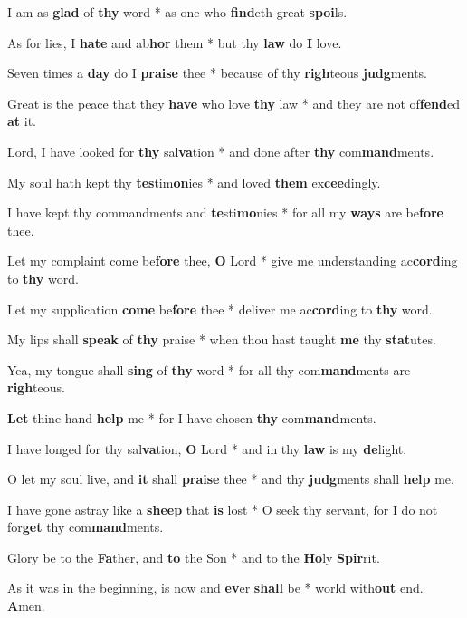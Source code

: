 \begin{multicols}{2}
	I am as \textbf{glad} of \textbf{thy} word * as one who \textbf{find}eth great \textbf{spoi}ls.
	
	As for lies, I \textbf{hate} and ab\textbf{hor} them * but thy \textbf{law} do \textbf{I} love.
	
	Seven times a \textbf{day} do I \textbf{praise} thee * because of thy \textbf{righ}teous \textbf{judg}ments.
	
	Great is the peace that they \textbf{have} who love \textbf{thy} law * and they are not of\textbf{fend}ed \textbf{at} it.
	
	Lord, I have looked for \textbf{thy} sal\textbf{va}tion * and done after \textbf{thy} com\textbf{mand}ments.
	
	My soul hath kept thy \textbf{tes}tim\textbf{on}ies * and loved \textbf{them} ex\textbf{cee}dingly.
	
	I have kept thy commandments and \textbf{te}sti\textbf{mo}nies * for all my \textbf{ways} are be\textbf{fore} thee.
	
	Let my complaint come be\textbf{fore} thee, \textbf{O} Lord * give me understanding ac\textbf{cord}ing to \textbf{thy} word.
	
	Let my supplication \textbf{come} be\textbf{fore} thee * deliver me ac\textbf{cord}ing to \textbf{thy} word.
	
	My lips shall \textbf{speak} of \textbf{thy} praise * when thou hast taught \textbf{me} thy \textbf{stat}utes.
	
	Yea, my tongue shall \textbf{sing} of \textbf{thy} word * for all thy com\textbf{mand}ments are \textbf{righ}teous.
	
	\textbf{Let} thine hand \textbf{help} me * for I have chosen \textbf{thy} com\textbf{mand}ments.
	
	I have longed for thy sal\textbf{va}tion, \textbf{O} Lord * and in thy \textbf{law} is my \textbf{de}light.
	
	O let my soul live, and \textbf{it} shall \textbf{praise} thee * and thy \textbf{judg}ments shall \textbf{help} me.
	
	I have gone astray like a \textbf{sheep} that \textbf{is} lost * O seek thy servant, for I do not for\textbf{get} thy com\textbf{mand}ments.
	
	Glory be to the \textbf{Fa}ther, and \textbf{to} the Son * and to the \textbf{Ho}ly \textbf{Spir}rit.
	
	As it was in the beginning, is now and \textbf{ev}er \textbf{shall} be * world with\textbf{out} end. \textbf{A}men.
\end{multicols}